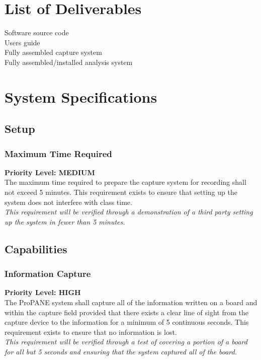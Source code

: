 \documentclass[]{article}
\begin{document}
	\section{List of Deliverables}
		
		Software source code\\
		Users guide\\
		Fully assembled capture system\\
		Fully assembled/installed analysis system\\
	
	\section{System Specifications}
		
		\subsection{Setup}
				
			\subsubsection{Maximum Time Required}
				\textbf{Priority Level: MEDIUM}\\
				The maximum time required to prepare the capture system for recording shall not exceed 5 minutes. This requirement exists to ensure that setting up the system does not interfere with class time.\\
				\emph{This requirement will be verified through a demonstration of a third party setting up the system in fewer than 5 minutes.}
		
		\subsection{Capabilities}
			
			\subsubsection{Information Capture}
				\textbf{Priority Level: HIGH}\\
				The ProPANE system shall capture all of the information written on a board and within the capture field provided that there exists a clear line of sight from the capture device to the information for a minimum of 5 continuous seconds. This requirement exists to ensure that no information is lost.\\
				\emph{This requirement will be verified through a test of covering a portion of a board for all but 5 seconds and ensuring that the system captured all of the board. }
	
\end{document}
